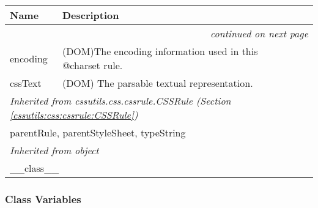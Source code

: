     \vspace{-1cm}
\hspace{\varindent}\begin{longtable}{|p{\varnamewidth}|p{\vardescrwidth}|l}
\cline{1-2}
\cline{1-2} \centering \textbf{Name} & \centering \textbf{Description}& \\
\cline{1-2}
\endhead\cline{1-2}\multicolumn{3}{r}{\small\textit{continued on next page}}\\\endfoot\cline{1-2}
\endlastfoot\raggedright e\-n\-c\-o\-d\-i\-n\-g\- & \raggedright (DOM)The encoding information used in this @charset rule.&\\
\cline{1-2}
\raggedright c\-s\-s\-T\-e\-x\-t\- & \raggedright (DOM) The parsable textual representation.&\\
\cline{1-2}
\multicolumn{2}{|l|}{\textit{Inherited from cssutils.css.cssrule.CSSRule \textit{(Section \ref{cssutils:css:cssrule:CSSRule})}}}\\
\multicolumn{2}{|p{\varwidth}|}{\raggedright parentRule, parentStyleSheet, typeString}\\
\cline{1-2}
\multicolumn{2}{|l|}{\textit{Inherited from object}}\\
\multicolumn{2}{|p{\varwidth}|}{\raggedright \_\_class\_\_}\\
\cline{1-2}
\end{longtable}



  \subsubsection{Class Variables}

